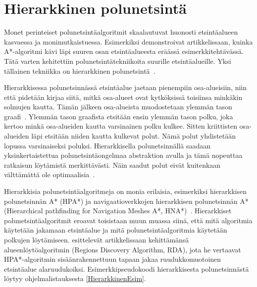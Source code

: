 \section{Hierarkkinen polunetsintä}\label{hpa}
Monet perinteiset polunetsintäalgoritmit skaalautuvat huonosti etsintäalueen 
kasvaessa ja monimutkaistuessa. Esimerkiksi \textcite{rda} demonstroivat 
artikkelissaan, kuinka A*-algoritmi kävi läpi suuren osan etsintäalueesta 
eräässä esimerkkitehtävässä. Tätä varten kehitettiin polunetsintätekniikoita 
suurille etsintäalueille. Yksi tällainen tekniikka on hierarkkinen 
polunetsintä~\cite{rda}. \par
	Hierarkkisessa polunetsinnässä etsintäalue jaetaan pienempiin 
osa-alueisiin, niin että pidetään kirjaa siitä, mitkä osa-alueet ovat 
kytköksissä toisiinsa minkäkin solmujen kautta. Tämän jälkeen 
osa-alueista muodostetaan ylemmän tason graafi~\cite{rda}. Ylemmän tason 
graafista etsitään ensin ylemmän tason polku, joka kertoo minkä 
osa-alueiden kautta varsinainen polku kulkee. Sitten kriittisten osa-alueiden 
läpi etsitään niiden kautta kulkevat polut. Nämä polut yhdistetään lopussa 
varsinaiseksi poluksi. Hierarkkisella polunetsinnällä saadaan 
yksinkertaistettua polunetsintäongelmaa abstraktion avulla ja tämä nopeuttaa 
ratkaisun löytämistä merkittävästi. Näin saadut polut eivät kuitenkaan 
välttämättä ole optimaalisia~\cite{rda}.\par
	Hierarkkisia polunetsintäalgoritmeja on monia erilaisia, esimerkiksi 
hierarkkisen polunetsinnän A* (HPA*) ja navigaatioverkkojen hierarkkisen 
polunetsinnän A* (Hierarchical pathfinding for Navigation Meshes A*, 
HNA*)~\cite{rda}. Hierarkkiset polunetsintäalgoritmit eroavat toisistaan muun 
muassa siinä, että mitä algoritmia käytetään jakamaan etsintäalue ja mitä 
polunetsintäalgoritmia käytetään polkujen löytämiseen. \textcite{rda} 
esittelevät artikkelissaan kehittämänsä alueenlöytöalgoritmin (Regions 
Discovery Algorithm, RDA), jota he vertaavat HPA*-algoritmin 
sisäänrakennettuun tapaan jakaa ruudukkomuotoinen etsintäalue alaruudukoiksi. 
Esimerkkipseudokoodi hierarkkisesta polunetsinnästä löytyy ohjelmalistauksesta 
\ref{HierarkkinenEsim}.
